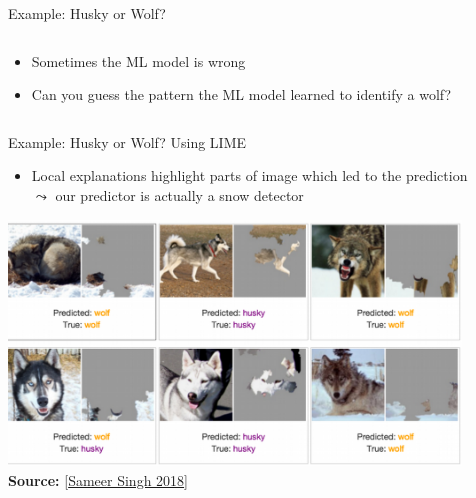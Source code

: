 \documentclass[10pt,compress,t,notes=noshow, xcolor=table]{beamer}
\begin{document}
\begin{frame}[t]{Example: Husky or Wolf?}
\begin{columns}[T, onlytextwidth]
	\begin{column}{0.55\textwidth}
	    
	\begin{itemize}
		\item Sometimes the ML model is wrong
		\item Can you guess the pattern the ML model learned to identify a wolf?
	\end{itemize}
	    
	\end{column}
	    
	\end{columns}

\end{frame}


\begin{frame}[t]{Example: Husky or Wolf? Using LIME}
	\begin{itemize}
		\item Local explanations highlight parts of image which led to the prediction\\
        $\leadsto$ our predictor is actually a snow detector 
	\end{itemize}
    
	\begin{center}
		\includegraphics[width=0.9\textwidth]{figure/lime-wolfhusky3.png}\\
		{\textbf{Source:} [\href{http://www.facweb.iitkgp.ac.in/~niloy/COURSE/Spring2018/IntelligentSystem/PPT_2018/why_should_i_trust_ppt.pdf}{Sameer Singh 2018}]}
	\end{center}







\end{frame}
\end{document}
